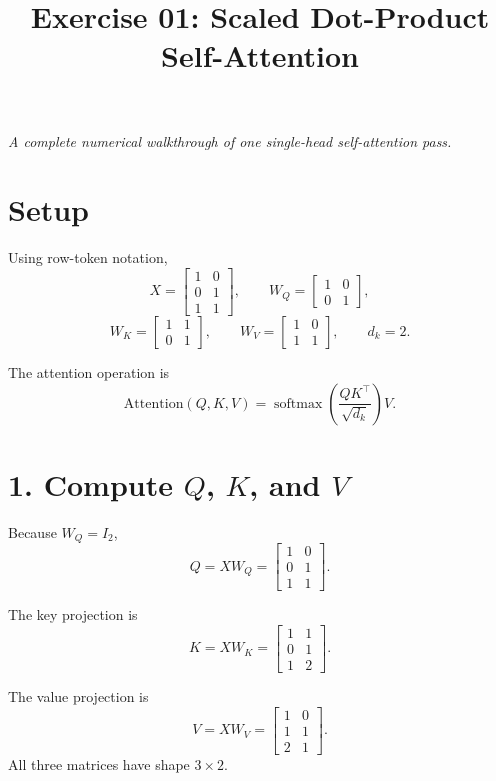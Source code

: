 \documentclass[11pt]{article}
\title{\textbf{Exercise 01: Scaled Dot-Product Self-Attention}}
\author{}
\date{}
\newcommand{\softmax}{\operatorname{softmax}}
\begin{document}
\maketitle

\begin{center}
\emph{A complete numerical walkthrough of one single-head self-attention pass.}
\end{center}

\section*{Setup}

Using row-token notation,
\[
X=
\begin{bmatrix}
1&0\\
0&1\\
1&1
\end{bmatrix},
\qquad
W_Q=
\begin{bmatrix}1&0\\0&1\end{bmatrix},
\]
\[
W_K=
\begin{bmatrix}1&1\\0&1\end{bmatrix},
\qquad
W_V=
\begin{bmatrix}1&0\\1&1\end{bmatrix},
\qquad d_k=2.
\]

The attention operation is
\[
\mathrm{Attention}(Q,K,V)
=\softmax\left(\frac{QK^\top}{\sqrt{d_k}}\right)V.
\]

\section*{1. Compute $Q$, $K$, and $V$}

Because $W_Q=I_2$,
\[
Q=XW_Q=
\begin{bmatrix}
1&0\\
0&1\\
1&1
\end{bmatrix}.
\]

The key projection is
\[
K=XW_K=
\begin{bmatrix}
1&1\\
0&1\\
1&2
\end{bmatrix}.
\]

The value projection is
\[
V=XW_V=
\begin{bmatrix}
1&0\\
1&1\\
2&1
\end{bmatrix}.
\]
All three matrices have shape $3\times2$.
\end{document}

